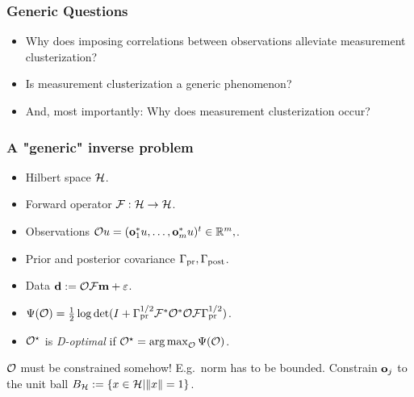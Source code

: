 \documentclass{beamer}
\begin{document}
\begin{frame}
\frametitle{Generic Questions}
\begin{itemize}
\item Why does imposing correlations between observations alleviate
measurement clusterization?
%
\item Is measurement clusterization a generic phenomenon?
%
\item And, most importantly: Why does measurement clusterization occur?
\end{itemize}
\end{frame}

\begin{frame}
\frametitle{A "generic" inverse problem}

\begin{itemize}
\item Hilbert space \(\mathcal{H}\).
\item Forward operator \(\mathcal{F}: \mathcal{H} \to \mathcal{H}\).
\item Observations \(\mathcal{O} u = (\mathbf{o}_1^*u, \dots, \mathbf{o}_m^*u )^t \in \mathbb{R}^m,\).
\item Prior and posterior covariance \( \Gamma_{\textup{pr}}, \Gamma_{\textup{post}}\).
\item Data \(\mathbf{d} := \mathcal{O} \mathcal{F} \mathbf{m} + \varepsilon\).
\item \(\Psi( \mathcal{O}) = \frac12 \log \det ( I + 
  \Gamma_{\textup{pr}}^{1/2} \mathcal{F} ^* \mathcal{O}^* \mathcal{O} \mathcal{F} \Gamma_{\textup{pr}}^{1/2})\).
\item \(\mathcal{O}^{\star}\) is \emph{D-optimal} if \(\mathcal{O}^{\star} =
  \operatorname*{arg\,max}_{\mathcal{O}} \Psi(\mathcal{O})\).
\end{itemize}

\(\mathcal{O}\) must be constrained somehow! E.g.~norm has to be bounded.
Constrain \(\mathbf{o}_j\) to the unit ball \(B_{\mathcal{H}} := \{x\in \mathcal{H}| \|x\| = 1\}\).


\end{frame}
\end{document}
